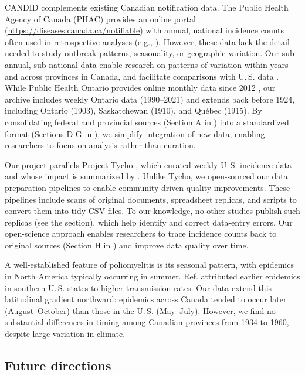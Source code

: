 \documentclass[10pt,letterpaper]{article}
\begin{document}
CANDID complements existing Canadian notification data. The Public Health Agency of Canada (PHAC) provides an online portal \cite{totten2019updates} (\url{https://diseases.canada.ca/notifiable}) with annual, national incidence counts often used in retrospective analyses (e.g., \cite{payne2014hepatitis,gasmi2017emerging,lin2021relaying,lin2021influenza,thommes2020revisiting,golden2024ccdr}). However, these data lack the detail needed to study outbreak patterns, seasonality, or geographic variation. Our sub-annual, sub-national data enable research on patterns of variation within years and across provinces in Canada, and facilitate comparisons with U.\,S. data \cite{van2018project}. While Public Health Ontario provides online monthly data since 2012 \cite{phoquery}, our archive includes weekly Ontario data (1990--2021) and extends back before 1924, including Ontario (1903), Saskatchewan (1910), and Québec (1915). By consolidating federal and provincial sources (Section A in ) into a standardized format (Sections D-G in ), we simplify integration of new data, enabling researchers to focus on analysis rather than curation.

Our project parallels Project Tycho \cite{van2013contagious}, which curated weekly U.\,S. incidence data and whose impact is summarized by \cite{van2018project}. Unlike Tycho, we open-sourced our data preparation pipelines to enable community-driven quality improvements. These pipelines include scans of original documents, spreadsheet replicas, and scripts to convert them into tidy CSV files. To our knowledge, no other studies publish such replicas (see the  section), which help identify and correct data-entry errors. Our open-science approach enables researchers to trace incidence counts back to original sources (Section H in ) and improve data quality over time.

A well-established feature of poliomyelitis is its seasonal pattern, with epidemics in North America typically occurring in summer. Ref. \cite{martinez2015unraveling} attributed earlier epidemics in southern U.\,S. states to higher transmission rates. Our data extend this latitudinal gradient northward: epidemics across Canada tended to occur later (August--October) than those in the U.\,S. (May--July). However, we find no substantial differences in timing among Canadian provinces from 1934 to 1960, despite large variation in climate.

\subsection*{Future directions}\label{sec:future}
\end{document}
